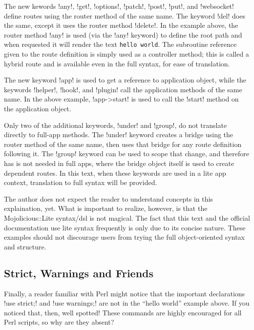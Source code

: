 The new kewords \lstmojolite!any!, \lstmojolite!get!, \lstmojolite!options!, \lstmojolite!patch!, 
\lstmojolite!post!, \lstmojolite!put!, and \lstmojolite!websocket! define routes using the router method of the same name. 
The keyword \lstmojolite!del! does the same, except it uses the router method \lstperl!delete!.
In the example above, the router method \lstperl!any! is used (via the \lstmojolite!any! keyword) 
to define the root path and when requested it will render the text \verb!hello world!.
The subroutine reference given to the route definition is simply used as a controller method; 
this is called a hybrid route and is available even in the full syntax, for ease of translation.

The new keyword \lstmojolite!app! is used to get a reference to application object, 
while the keywords \lstmojolite!helper!, \lstmojolite!hook!, and \lstmojolite!plugin! call the application methods of the same name.
In the above example, \lstmojolite!app->start! is used to call the \lstperl!start! method on the application object.

Only two of the additional keywords, \lstmojolite!under! and \lstmojolite!group!, do not translate directly to full-app methods.
The \lstmojolite!under! keyword creates a bridge using the router method of the same name, 
then uses that bridge for any route definition following it.
The \lstmojolite!group! keyword can be used to scope that change, and therefore has is not needed in full apps, 
where the bridge object itself is used to create dependent routes.
In this text, when these keywords are used in a lite app context, translation to full syntax will be provided.

The author does not expect the reader to understand concepts in this explaination, yet.
What is important to realize, however, is that the Mojolicious::Lite syntax/dsl is not magical.
The fact that this text and the official documentation use lite syntax frequently is only due to its concise nature.
These examples should not discourage users from trying the full object-oriented syntax and structure.

\subsection{Strict, Warnings and Friends}

Finally, a reader familiar with Perl might notice that the important declarations \lstperl!use strict;! 
and \lstperl!use warnings;! are not in the ``hello world'' example above.
If you noticed that, then, well spotted!
These commands are highly encouraged for all Perl scripts, so why are they absent?

